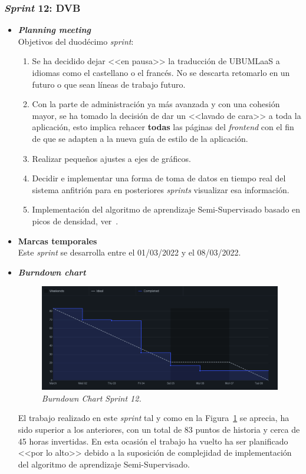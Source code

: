 \subsubsection{\textit{Sprint} 12: DVB}
\begin{itemize}
\item \textbf{\textit{Planning meeting}}\\
Objetivos del duodécimo \textit{sprint}:
\begin{enumerate}
\item Se ha decidido dejar <<en pausa>> la traducción de UBUMLaaS a idiomas como el castellano o el francés. No se descarta retomarlo en un futuro o que sean líneas de trabajo futuro.
\item Con la parte de administración ya más avanzada y con una cohesión mayor, se ha tomado la decisión de dar un <<lavado de cara>> a toda la aplicación, esto implica rehacer \textbf{todas} las páginas del \textit{frontend} con el fin de que se adapten a la nueva guía de estilo de la aplicación.
\item Realizar pequeños ajustes a ejes de gráficos.
\item Decidir e implementar una forma de toma de datos en tiempo real del sistema anfitrión para en posteriores \textit{sprints} visualizar esa información.
\item Implementación del algoritmo de aprendizaje Semi-Supervisado basado en picos de densidad, ver~\cite{WU2018180}.
\end{enumerate}

\item \textbf{Marcas temporales}\\
Este \textit{sprint} se desarrolla entre el 01/03/2022 y el 08/03/2022.

\item \textbf{\textit{Burndown chart}}\\
\begin{figure}
\begin{center}
\includegraphics[width=\textwidth]{../img/anexos/sprints/BD-Sprint12}
\caption{\textit{Burndown Chart Sprint 12.}}\label{fig:BD-Sprint12}
\end{center}
\end{figure}
El trabajo realizado en este \textit{sprint} tal y como en la Figura~\ref{fig:BD-Sprint12} se aprecia, ha sido superior a los anteriores, con un total de 83 puntos de historia y cerca de 45 horas invertidas. En esta ocasión el trabajo ha vuelto ha ser planificado <<por lo alto>> debido a la suposición de complejidad de implementación del algoritmo de aprendizaje Semi-Supervisado. 


\end{itemize}
